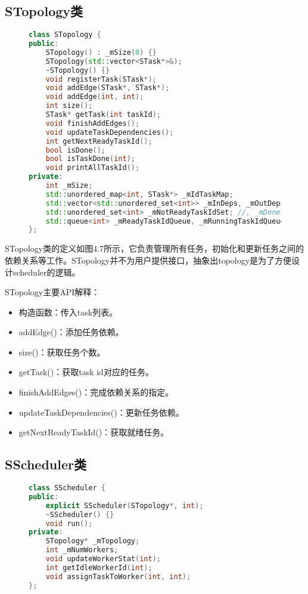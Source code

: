 \subsection{STopology类}

\begin{figure}[!htbp]
    \centering
\begin{lstlisting}[language=c++,caption={}]
class STopology {
public:
    STopology() : _mSize(0) {}
    STopology(std::vector<STask*>&);
    ~STopology() {}
    void registerTask(STask*);
    void addEdge(STask*, STask*);
    void addEdge(int, int);
    int size();
    STask* getTask(int taskId);
    void finishAddEdges();
    void updateTaskDependencies();
    int getNextReadyTaskId();
    bool isDone();
    bool isTaskDone(int);
    void printAllTaskId();
private:
    int _mSize;
    std::unordered_map<int, STask*> _mIdTaskMap;
    std::vector<std::unordered_set<int>> _mInDeps, _mOutDeps;
    std::unordered_set<int> _mNotReadyTaskIdSet; //, _mDoneTaskIdSet;
    std::queue<int> _mReadyTaskIdQueue, _mRunningTaskIdQueue, _mDoneTaskIdQueue;
};
\end{lstlisting}
    \label{fig:4_stopology}
\end{figure}

STopology类的定义如图4.7所示，它负责管理所有任务，初始化和更新任务之间的依赖关系等工作。STopology并不为用户提供接口，抽象出topology是为了方便设计scheduler的逻辑。

STopology主要API解释：

\begin{itemize}
	\item 构造函数：传入task列表。
	\item addEdge()：添加任务依赖。
	\item size()：获取任务个数。
	\item getTask()：获取task id对应的任务。
	\item finishAddEdges()：完成依赖关系的指定。
	\item updateTaskDependencies()：更新任务依赖。
	\item getNextReadyTaskId()：获取就绪任务。
\end{itemize}

\subsection{SScheduler类}

\begin{figure}[!htbp]
    \centering
\begin{lstlisting}[language=c++,caption={}]
class SScheduler {
public:
    explicit SScheduler(STopology*, int);
    ~SScheduler() {}
    void run();
private:
    STopology* _mTopology;
    int _mNumWorkers;
    void updateWorkerStat(int);
    int getIdleWorkerId(int);
    void assignTaskToWorker(int, int);
};
\end{lstlisting}
    \label{fig:4_sscheduler}
\end{figure}

